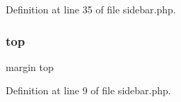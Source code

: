 Definition at line 35 of file sidebar.\+php.

\mbox{\label{waiter_2sidebar_8php_a92a4f9c60f5fc724a2e9a4fdb35e9777}} 
\subsubsection{\texorpdfstring{top}{top}}
{\footnotesize\ttfamily margin top}



Definition at line 9 of file sidebar.\+php.


